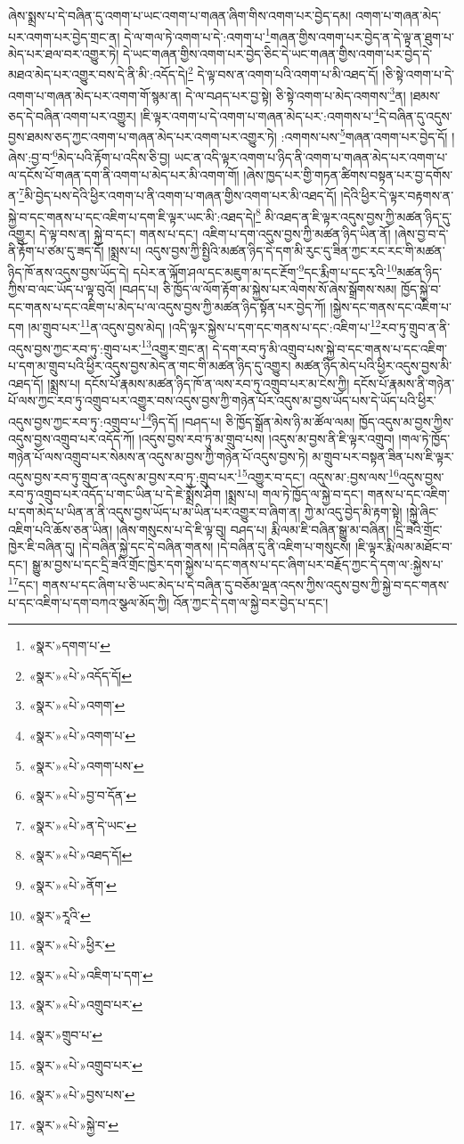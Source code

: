 ཞེས་སྨྲས་པ་དེ་བཞིན་དུ་འགག་པ་ཡང་འགག་པ་གཞན་ཞིག་གིས་འགག་པར་བྱེད་དམ། འགག་པ་གཞན་མེད་པར་འགག་པར་བྱེད་གྲང་ན། དེ་ལ་གལ་ཏེ་འགག་པ་དེ་:འགག་པ་\footnote{«སྣར་»དགག་པ་}གཞན་གྱིས་འགག་པར་བྱེད་ན་དེ་ལྟ་ན་ཐུག་པ་མེད་པར་ཐལ་བར་འགྱུར་ཏེ། དེ་ཡང་གཞན་གྱིས་འགག་པར་བྱེད་ཅིང་དེ་ཡང་གཞན་གྱིས་འགག་པར་བྱེད་དེ་མཐའ་མེད་པར་འགྱུར་བས་དེ་ནི་མི་:འདོད་དེ།\footnote{«སྣར་»«པེ་»འདོད་དོ།} དེ་ལྟ་བས་ན་འགག་པའི་འགག་པ་མི་འཐད་དོ། །ཅི་སྟེ་འགག་པ་དེ་འགག་པ་གཞན་མེད་པར་འགག་གོ་སྙམ་ན། དེ་ལ་བཤད་པར་བྱ་སྟེ། ཅི་སྟེ་འགག་པ་མེད་འགགས་\footnote{«སྣར་»«པེ་»འགག་}ན། །ཐམས་ཅད་དེ་བཞིན་འགག་པར་འགྱུར། །ཇི་ལྟར་འགག་པ་དེ་འགག་པ་གཞན་མེད་པར་:འགགས་པ་\footnote{«སྣར་»«པེ་»འགག་པ་}དེ་བཞིན་དུ་འདུས་བྱས་ཐམས་ཅད་ཀྱང་འགག་པ་གཞན་མེད་པར་འགག་པར་འགྱུར་ཏེ། :འགགས་པས་\footnote{«སྣར་»«པེ་»འགག་པས་}གཞན་འགག་པར་བྱེད་དོ། །ཞེས་:བྱ་བ་\footnote{«སྣར་»«པེ་»བྱ་བ་དོན་}མེད་པའི་རྟོག་པ་འདིས་ཅི་བྱ། ཡང་ན་འདི་ལྟར་འགག་པ་ཉིད་ནི་འགག་པ་གཞན་མེད་པར་འགག་པ་ལ་དངོས་པོ་གཞན་དག་ནི་འགག་པ་མེད་པར་མི་འགག་གོ། །ཞེས་ཁྱད་པར་གྱི་གཏན་ཚིགས་བསྟན་པར་བྱ་དགོས་ན་\footnote{«སྣར་»«པེ་»ན་དེ་ཡང་}མི་བྱེད་པས་དེའི་ཕྱིར་འགག་པ་ནི་འགག་པ་གཞན་གྱིས་འགག་པར་མི་འཐད་དོ། །དེའི་ཕྱིར་དེ་ལྟར་བརྟགས་ན་སྐྱེ་བ་དང་གནས་པ་དང་འཇིག་པ་དག་ཇི་ལྟར་ཡང་མི་:འཐད་དེ།\footnote{«སྣར་»«པེ་»འཐད་དོ།} མི་འཐད་ན་ཇི་ལྟར་འདུས་བྱས་ཀྱི་མཚན་ཉིད་དུ་འགྱུར། དེ་ལྟ་བས་ན། སྐྱེ་བ་དང་། གནས་པ་དང་། འཇིག་པ་དག་འདུས་བྱས་ཀྱི་མཚན་ཉིད་ཡིན་ནོ། །ཞེས་བྱ་བ་དེ་ནི་རྟོག་པ་ཙམ་དུ་ཟད་དོ། །སྨྲས་པ། འདུས་བྱས་ཀྱི་སྤྱིའི་མཚན་ཉིད་དེ་དག་མི་རུང་དུ་ཟིན་ཀྱང་རང་རང་གི་མཚན་ཉིད་ཁོ་ནས་འདུས་བྱས་ཡོད་དེ། དཔེར་ན་ལྐོག་ཤལ་དང་མཇུག་མ་དང་རྔོག་\footnote{«སྣར་»«པེ་»ནོག་}དང་རྨིག་པ་དང་རྭའི་\footnote{«སྣར་»རཱའི་}མཚན་ཉིད་ཀྱིས་བ་ལང་ཡོད་པ་ལྟ་བུའོ། །བཤད་པ། ཅི་ཁྱོད་ལ་ལོག་རྟོག་མ་སྐྱེས་པར་ལེགས་སོ་ཞེས་སྒྲོགས་སམ། ཁྱོད་སྐྱེ་བ་དང་གནས་པ་དང་འཇིག་པ་མེད་པ་ལ་འདུས་བྱས་ཀྱི་མཚན་ཉིད་སྟོན་པར་བྱེད་ཀོ། །སྐྱེས་དང་གནས་དང་འཇིག་པ་དག །མ་གྲུབ་པར་\footnote{«སྣར་»«པེ་»ཕྱིར་}ན་འདུས་བྱས་མེད། །འདི་ལྟར་སྐྱེས་པ་དག་དང་གནས་པ་དང་:འཇིག་པ་\footnote{«སྣར་»«པེ་»འཇིག་པ་དག་}རབ་ཏུ་གྲུབ་ན་ནི་འདུས་བྱས་ཀྱང་རབ་ཏུ་:གྲུབ་པར་\footnote{«སྣར་»«པེ་»འགྲུབ་པར་}འགྱུར་གྲང་ན། དེ་དག་རབ་ཏུ་མི་འགྲུབ་པས་སྐྱེ་བ་དང་གནས་པ་དང་འཇིག་པ་དག་མ་གྲུབ་པའི་ཕྱིར་འདུས་བྱས་མེད་ན་གང་གི་མཚན་ཉིད་དུ་འགྱུར། མཚན་ཉིད་མེད་པའི་ཕྱིར་འདུས་བྱས་མི་འཐད་དོ། །སྨྲས་པ། དངོས་པོ་རྣམས་མཚན་ཉིད་ཁོ་ན་ལས་རབ་ཏུ་འགྲུབ་པར་མ་ངེས་ཀྱི། དངོས་པོ་རྣམས་ནི་གཉེན་པོ་ལས་ཀྱང་རབ་ཏུ་འགྲུབ་པར་འགྱུར་བས་འདུས་བྱས་ཀྱི་གཉེན་པོར་འདུས་མ་བྱས་ཡོད་པས་དེ་ཡོད་པའི་ཕྱིར་འདུས་བྱས་ཀྱང་རབ་ཏུ་:འགྲུབ་པ་\footnote{«སྣར་»གྲུབ་པ་}ཉིད་དོ། །བཤད་པ། ཅི་ཁྱོད་སྒྲོན་མེས་ཉི་མ་ཚོལ་ལམ། ཁྱོད་འདུས་མ་བྱས་ཀྱིས་འདུས་བྱས་འགྲུབ་པར་འདོད་ཀོ། །འདུས་བྱས་རབ་ཏུ་མ་གྲུབ་པས། །འདུས་མ་བྱས་ནི་ཇི་ལྟར་འགྲུབ། །གལ་ཏེ་ཁྱོད་གཉེན་པོ་ལས་འགྲུབ་པར་སེམས་ན་འདུས་མ་བྱས་ཀྱི་གཉེན་པོ་འདུས་བྱས་ཏེ། མ་གྲུབ་པར་བསྟན་ཟིན་པས་ཇི་ལྟར་འདུས་བྱས་རབ་ཏུ་གྲུབ་ན་འདུས་མ་བྱས་རབ་ཏུ་:གྲུབ་པར་\footnote{«སྣར་»«པེ་»འགྲུབ་པར་}འགྱུར་བ་དང་། འདུས་མ་:བྱས་ལས་\footnote{«སྣར་»«པེ་»བྱས་པས་}འདུས་བྱས་རབ་ཏུ་འགྲུབ་པར་འདོད་པ་གང་ཡིན་པ་དེ་ཇེ་སྨྲོས་ཤིག །སྨྲས་པ། གལ་ཏེ་ཁྱོད་ལ་སྐྱེ་བ་དང་། གནས་པ་དང་འཇིག་པ་དག་མེད་པ་ཡིན་ན་ནི་འདུས་བྱས་ཡོད་པ་མ་ཡིན་པར་འགྱུར་བ་ཞིག་ན། ཀྱེ་མ་འདུ་བྱེད་མི་རྟག་སྟེ། །སྐྱེ་ཞིང་འཇིག་པའི་ཆོས་ཅན་ཡིན། །ཞེས་གསུངས་པ་དེ་ཇི་ལྟ་བུ། བཤད་པ། རྨི་ལམ་ཇི་བཞིན་སྒྱུ་མ་བཞིན། །དྲི་ཟའི་གྲོང་ཁྱེར་ཇི་བཞིན་དུ། །དེ་བཞིན་སྐྱེ་དང་དེ་བཞིན་གནས། །དེ་བཞིན་དུ་ནི་འཇིག་པ་གསུངས། །ཇི་ལྟར་རྨི་ལམ་མཐོང་བ་དང་། སྒྱུ་མ་བྱས་པ་དང་དྲི་ཟའི་གྲོང་ཁྱེར་དག་སྐྱེས་པ་དང་གནས་པ་དང་ཞིག་པར་བརྗོད་ཀྱང་དེ་དག་ལ་:སྐྱེས་པ་\footnote{«སྣར་»«པེ་»སྐྱེ་བ་}དང་། གནས་པ་དང་ཞིག་པ་ཅི་ཡང་མེད་པ་དེ་བཞིན་དུ་བཅོམ་ལྡན་འདས་ཀྱིས་འདུས་བྱས་ཀྱི་སྐྱེ་བ་དང་གནས་པ་དང་འཇིག་པ་དག་བཀའ་སྩལ་མོད་ཀྱི། འོན་ཀྱང་དེ་དག་ལ་སྐྱེ་བར་བྱེད་པ་དང་། 